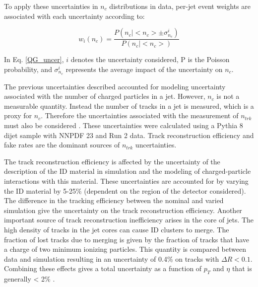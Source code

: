 To apply these uncertainties in $n_{c}$ distributions in data, per-jet event weights are associated with each uncertainty according to:

\begin{equation}
w_{i}(n_{c}) = \frac{P(n_{c}|<n_{c}> \pm \sigma^{i}_{n_{c}})} {P(n_{c}|<n_{c}>)}
\label{QG_uncer}
\end{equation}

In Eq. \ref{QG_uncer}, $i$ denotes the uncertainty considered, P is the Poisson probability, and $\sigma^{i}_{n_{c}}$ represents the average impact of the uncertainty on $n_{c}$. 



The previous uncertainties described accounted for modeling uncertainty associated with the number of charged particles in a jet. However, $n_{c}$ is not a measurable quantity. Instead the number of tracks in a jet is measured, which is a proxy for $n_{c}$. Therefore the uncertainties associated with the measurement of $n_{trk}$ must also be considered \cite{JetFrag}. These uncertainties were calculated using a Pythia 8 dijet sample with NNPDF 23 and Run 2 data. Track reconstruction efficiency and fake rates are the dominant sources of $n_{trk}$ uncertainties. 

The track reconstruction efficiency is affected by the uncertainty of the description of the ID material in simulation and the modeling of charged-particle interactions with this material. These uncertainties are accounted for by varying the ID material by 5-25\% (dependent on the region of the detector considered). The difference in the tracking efficiency between the nominal and varied simulation give the uncertainty on the track reconstruction efficiency. Another important source of track reconstruction inefficiency arises in the core of jets. The high density of tracks in the jet cores can cause ID clusters to merge. The fraction of lost tracks due to merging is given by the fraction of tracks that have a charge of two minimum ionizing particles. This quantity is compared between data and simulation resulting in an uncertainty of 0.4\% on tracks with $\Delta R < 0.1$. Combining these effects gives a total uncertainty as a function of $p_{T}$ and $\eta$ that is generally < 2\% \cite{JetFrag}. 

